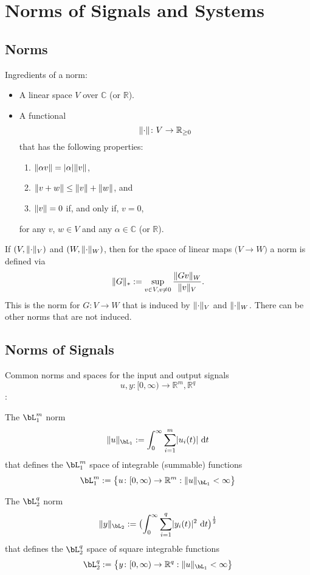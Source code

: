 \section{Norms of Signals and Systems}
\subsection{Norms}

Ingredients of a norm:
\begin{itemize}
	\item A linear space $V$ over $\mathbb C$ (or $\mathbb R$).
	\item A functional $$\lVert\cdot \rVert\colon V \to \mathbb R_{\geq 0}$$ that has the following properties:
		\begin{enumerate}
			\item $\lVert\alpha v \rVert = \lvert\alpha\rvert\lVert v \rVert$,
			\item $\lVert v+w \rVert \leq \lVert v \rVert+\lVert w \rVert$, and
			\item $\lVert v \rVert = 0$ if, and only if, $v=0$,
		\end{enumerate}
		for any $v$, $w\in V$ and any $\alpha \in \mathbb C$ (or $\mathbb R$).
\end{itemize}

If $(V,\lVert\cdot \rVert_V)$ and $(W,\lVert\cdot \rVert_W)$, then for the space of linear maps $\bigl ( V \to W \bigr)$ a norm is defined via
$$
\lVert G \rVert_* := \sup_{v\in V, v\neq 0}\frac{\lVert Gv \rVert_W}{\lVert v \rVert_V}.
$$
This is the norm for $G\colon V \to W$ that is induced by $\lVert\cdot \rVert_V$ and $\lVert\cdot \rVert_W$. There can be other norms that are not induced.

\subsection{Norms of Signals}
Common norms and spaces for the input and output signals 
$$u, y\colon [0, \infty) \to \mathbb R^{m}, \mathbb R^{q}$$:

The $\bL_1^m$ norm 
$$ \norm{u}_{\bL_1} := \int_0^\infty \sum_{i=1}^m\abs{u_i(t)} \inva t $$ 
that defines the $\bL_1^m$ space of integrable (summable) functions
$$\bL_1^m:=\bigl \{ u \colon [0, \infty) \to \mathbb R^{m} : \norm{u}_{\bL_1}<\infty \bigr \} $$

The $\bL_2^q$ norm 
$$ \norm{y}_{\bL_2} := \bigl(\int_0^\infty \sum_{i=1}^q\abs{y_i(t)}^2 \inva t\bigr)^{\frac 12} $$ 
that defines the $\bL_2^q$ space of square integrable functions
$$\bL_2^q:=\bigl \{ y \colon [0, \infty) \to \mathbb R^{q} : \norm{u}_{\bL_1}<\infty \bigr \} $$

